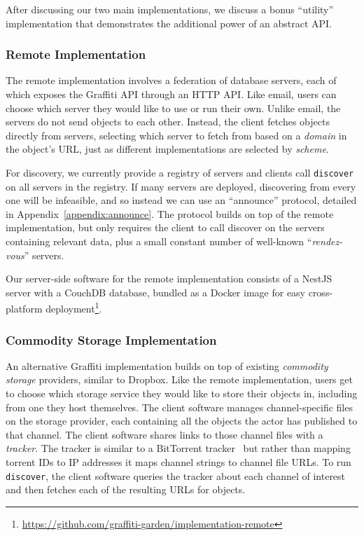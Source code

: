 After discussing our two main implementations, we discuss
a bonus ``utility'' implementation that demonstrates
the additional power of an abstract API.

\subsubsection{Remote Implementation}
\label{above-and-below:remote-protocol}

The remote implementation involves a federation of database servers,
each of which exposes the Graffiti API through an HTTP API.
Like email, users can choose which server they would
like to use or run their own.
Unlike email, the servers do not send objects to each other.
Instead, the client fetches objects directly from servers,
selecting which server to fetch from based on a \emph{domain}
in the object's URL, just as different implementations are selected by \emph{scheme}.

For discovery, we currently provide a registry of servers
and clients call \texttt{discover} on all servers in the registry.
If many servers are deployed, discovering from every one
will be infeasible, and so instead we can use an ``announce''
protocol, detailed in Appendix~\ref{appendix:announce}. The protocol builds on top of the remote implementation,
but only requires the client to
call discover on the servers containing relevant data,
plus a small constant number of well-known
``\emph{rendez-vous}'' servers.

Our server-side software for the remote implementation
consists of a NestJS server with a CouchDB database,
bundled as a Docker image for easy cross-platform
deployment\footnote{
\url{https://github.com/graffiti-garden/implementation-remote}
}.

\subsubsection{Commodity Storage Implementation}
\label{above-and-below:commodity-storage-protocol}

An alternative Graffiti implementation builds on top of existing
\emph{commodity storage} providers,
similar to Dropbox.
Like the remote implementation, users get to choose which storage
service they would like to store their objects in, including
from one they host themselves.
The client software
manages channel-specific files on the storage provider,
each containing all the objects the actor has published to that channel.
The client software shares links to those channel files with a \emph{tracker}.
The tracker is similar to a BitTorrent tracker~\cite{bittorrent} but
rather than mapping torrent IDs to IP addresses
it maps channel strings to channel file URLs.
To run \texttt{discover}, the client software queries the tracker
about each channel of interest and then fetches each of the resulting URLs for objects.

